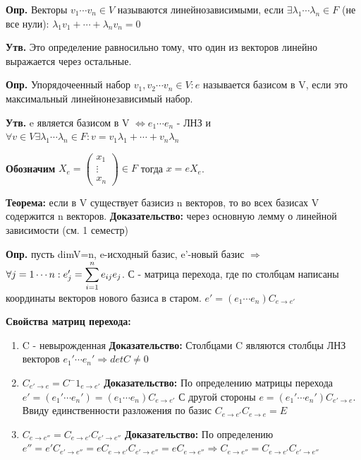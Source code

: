 \documentclass[12pt]{article}
\begin{document}
\textbf{Опр.} Векторы $v_1\cdots v_n \in V$ называются линейнозависимыми, если $\exists \lambda_1\cdots\lambda_n\in F$ (не все нули): $\lambda_1 v_1 + \cdots + \lambda_n v_n = 0$
\newline

\textbf{Утв.} Это определение равносильно тому, что один из векторов линейно выражается через остальные.
\newline

\textbf{Опр.} Упорядочеенный набор $v_1,v_2\cdots v_n \in V: e$ называется базисом в V, если это максимальный линейнонезависимый набор.
\newline

\textbf{Утв.} e является базисом в V $\Leftrightarrow e_1\cdots e_n$ - ЛНЗ и $\forall v\in V \exists\lambda_1\cdots\lambda_n\in F: v = v_1\lambda_1 + \cdots + v_n\lambda_n$ 
\newline

\textbf{Обозначим} $X_e = \begin{pmatrix} x_1 \\ \vdots \\ x_n \end{pmatrix} \in F$ тогда $x =eX_e$.
\newline

\textbf{Теорема:} если в V существует базисиз n векторов, то во всех базисах V содержится n векторов.\newline
\textbf{Доказательство:} через основную лемму о линейной зависимости (см. 1 семестр)
\newline

\textbf{Опр.} пусть dimV=n, e-исходный базис, e'-новый базис $\Rightarrow$ $\forall j=1\cdots n: \newline e_j'=\displaystyle\sum_{i=1}^n e_{ij}e_j$. С - матрица перехода, где по столбцам написаны координаты векторов нового базиса в старом. $e'=(e_1\cdots e_n)C_{e\to e'}$
\newline

\textbf{Свойства матриц перехода:}
\begin{enumerate}
\item C - невырожденная 
\newline \textbf{Доказательство:} Столбцами C являются столбцы ЛНЗ векторов $e_1'\cdots e_n' \Rightarrow detC \ne 0$
\item $C_{e'\to e} = C^-1_{e\to e'}$
\newline \textbf{Доказательство:} По определению матрицы перехода $e' = (e_1'\cdots e_n') = (e_1\cdots e_n)C_{e\to e'}$ С другой стороны $e = (e_1'\cdots e_n')C_{e'\to e}$. Ввиду единственности разложения по базис $C_{e\to e'}C_{e\to e} = E$
\item $C_{e\to e''} = C_{e\to e'}C_{e'\to e''}$
\newline \textbf{Доказательство:} По определению $e''=e'C_{e'\to e''}=eC_{e\to e'}C_{e'\to e''} = eC_{e\to e''} \Rightarrow C_{e\to e''} = C_{e\to e'}C_{e'\to e''}$

\end{enumerate}
\end{document}
